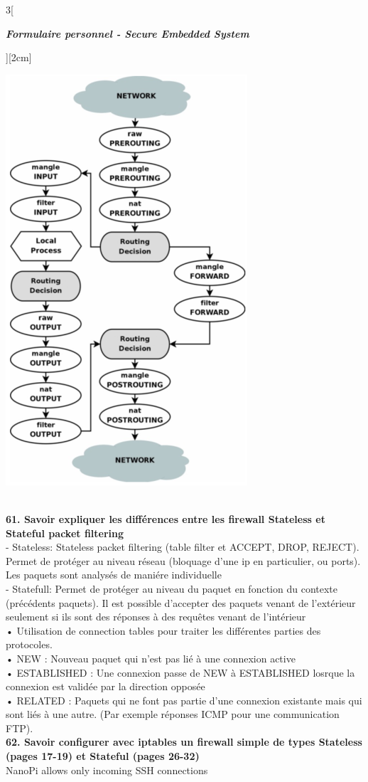 \begin{multicols}{3}[\centerline{ \large\em \textbf{Formulaire personnel - Secure Embedded System}}][2cm]
\begin{minipage}{\linewidth}
    \includegraphics[width =0.4\columnwidth, angle = 90]{images/42.png}
\end{minipage}
\\ \textbf{61. Savoir expliquer les différences entre les firewall Stateless et Stateful packet filtering\\}
- Stateless: Stateless packet filtering (table filter et ACCEPT,
DROP, REJECT). Permet de protéger au niveau
réseau (bloquage d’une ip en particulier, ou ports).
Les paquets sont analysés de maniére individuelle \\
- Statefull:  Permet de protéger au
niveau du paquet en fonction du contexte (précédents
paquets). Il est possible d’accepter des paquets venant
de l’extérieur seulement si ils sont des réponses à des
requêtes venant de l’intérieur\\
• Utilisation de connection tables pour traiter les
différentes parties des protocoles.\\
• NEW : Nouveau paquet qui n’est pas lié à une
connexion active\\
• ESTABLISHED : Une connexion passe de NEW
à ESTABLISHED losrque la connexion est validée
par la direction opposée\\
• RELATED : Paquets qui ne font pas partie d’une
connexion existante mais qui sont liés à une autre.
(Par exemple réponses ICMP pour une communication FTP).\\
\textbf{62. Savoir configurer avec iptables un firewall simple de types Stateless (pages 17-19) et Stateful (pages 26-32)\\}
NanoPi allows only incoming SSH connections\\
\begin{minipage}{\linewidth}

\end{minipage}
\end{multicols}

